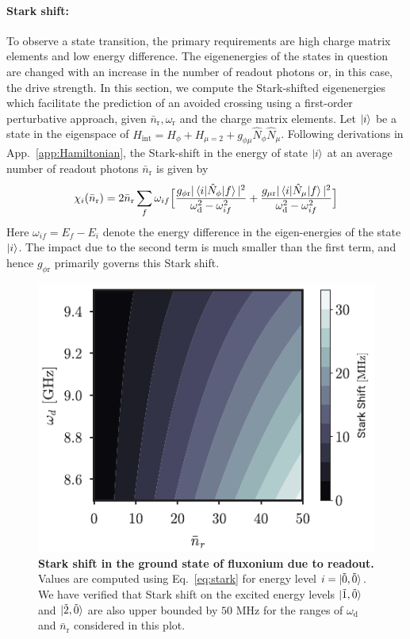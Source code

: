 \documentclass[%
reprint,
superscriptaddress,
 amsmath,amssymb,
 aps,
 prx,
longbibliography,
floatfix,
]{revtex4-2}
\begin{document}
{\paragraph{Stark shift:}\label{app:stark-shift}
To observe a state transition, the primary requirements are high charge matrix elements and low energy difference. The eigenenergies of the states in question are changed with an increase in the number of readout photons or, in this case, the drive strength. In this section, we compute the Stark-shifted eigenenergies which facilitate the prediction of an avoided crossing using a first-order perturbative approach, given $\bar n_\textrm{r}, \omega_\textrm{r}$ and the charge matrix elements.  Let $\ket{i}$ be a state in the eigenspace of $H_{\textrm{int}}=H_\phi+H_{\mu=2}+g_{\phi\mu}\hat N_\phi\hat N_\mu$. Following derivations in App.~\ref{app:Hamiltonian}, the Stark-shift in the energy of state $\ket{i}$ at an average number of readout photons $\bar n_\textrm{r}$ is given by
\begin{align}
    \chi_i(\bar n_\textrm{r})=2\bar n_\textrm{r}\sum_{f}\omega_{if}\Big[\frac{g_{\phi \textrm{r}}|\braket{i|\hat N_\phi|f}|^2}{\omega_\textrm{d}^2-\omega_{if}^2}+\frac{g_{\mu \textrm{r}}|\braket{i|\hat N_\mu|f}|^2}{\omega_\textrm{d}^2-\omega_{if}^2}\Big]\label{eq:stark}
\end{align}
 Here $\omega_{if}=E_f-E_i$ denote the energy difference in the eigen-energies of the state $\ket{i}$. The impact due to the second term is much smaller than the first term, and hence $g_{\phi \textrm{r}}$ primarily governs this Stark shift.
 \begin{figure}
     \centering
     \includegraphics[width=\linewidth]{Supp_Fig/Stark-shift.pdf}
     \caption{\textbf{Stark shift in the ground state of fluxonium due to readout.} Values are computed using Eq.~\ref{eq:stark} for energy level $i=\ket{\tilde{0},\tilde{0}}$. We have verified that Stark shift on the excited energy levels $\ket{\tilde{1},\tilde{0}}$ and $\ket{\tilde{2},\tilde{0}}$ are also upper bounded by $50$ MHz for the ranges of $\omega_\textrm{d}$ and $ \bar n_\textrm{r}$ considered in this plot.}
     \label{fig:stark-shift}
 \end{figure}

}
\end{document}
